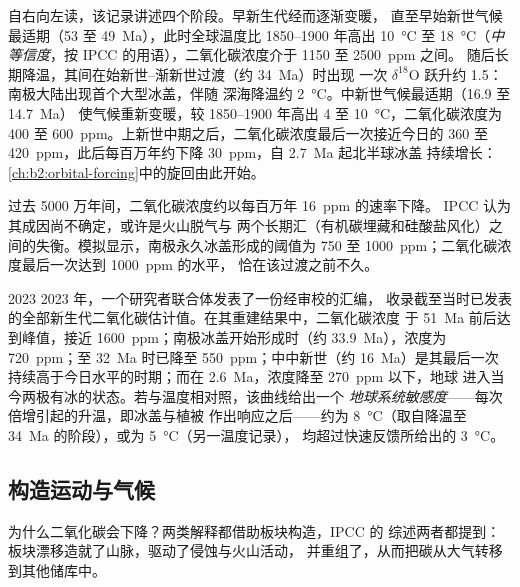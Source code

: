 自右向左读，该记录讲述四个阶段。早新生代经而逐渐变暖，
直至早始新世气候最适期（53 至 \qty{49}{Ma}），此时全球温度比 1850–1900 年高出
\qty{10}{\celsius} 至 \qty{18}{\celsius}（\emph{中等信度}，按 IPCC 的用语），二氧化碳浓度介于
1150 至 \qty{2500}{ppm} 之间。
随后长期降温，其间在始新世–渐新世过渡（约 \qty{34}{Ma}）时出现
一次 $\delta^{18}$O 跃升约 \qty{1.5}{\permil}：南极大陆出现首个大型冰盖，伴随
深海降温约 \qty{2}{\celsius}。中新世气候最适期（16.9 至 \qty{14.7}{Ma}）
使气候重新变暖，较 1850–1900 年高出 4 至 \qty{10}{\celsius}，二氧化碳浓度为 400 至
\qty{600}{ppm}。上新世中期之后，二氧化碳浓度最后一次接近今日的 360 至
\qty{420}{ppm}，此后每百万年约下降 \qty{30}{ppm}，自 \qty{2.7}{Ma} 起北半球冰盖
持续增长：\cref{ch:b2:orbital-forcing}中的旋回由此开始。

过去 5000 万年间，二氧化碳浓度约以每百万年 \qty{16}{ppm} 的速率下降。
IPCC 认为其成因尚不确定，或许是火山脱气与
两个长期汇（有机碳埋藏和硅酸盐风化）之间的失衡。模拟显示，南极永久冰盖形成的阈值为 750 至
\qty{1000}{ppm}；二氧化碳浓度最后一次达到 \qty{1000}{ppm} 的水平，
恰在该过渡之前不久。

\begin{dated}{2023}
2023 年，一个研究者联合体发表了一份经审校的汇编，
收录截至当时已发表的全部新生代二氧化碳估计值。在其重建结果中，二氧化碳浓度
于 \qty{51}{Ma} 前后达到峰值，接近 \qty{1600}{ppm}；南极冰盖开始形成时（约 \qty{33.9}{Ma}），浓度为 \qty{720}{ppm}；至
\qty{32}{Ma} 时已降至 \qty{550}{ppm}；中中新世（约 \qty{16}{Ma}）是其最后一次
持续高于今日水平的时期；而在 \qty{2.6}{Ma}，浓度降至 \qty{270}{ppm} 以下，地球
进入当今两极有冰的状态。若与温度相对照，该曲线给出一个
\emph{地球系统敏感度}——每次倍增引起的升温，即冰盖与植被
作出响应之后——约为 \qty{8}{\celsius}（取自降温至 \qty{34}{Ma} 的阶段），或为 \qty{5}{\celsius}（另一温度记录），
均超过快速反馈所给出的 \qty{3}{\celsius}。
\end{dated}

\subsection*{构造运动与气候}

为什么二氧化碳会下降？两类解释都借助板块构造，IPCC 的
综述两者都提到：板块漂移造就了山脉，驱动了侵蚀与火山活动，
并重组了，从而把碳从大气转移到其他储库中。

